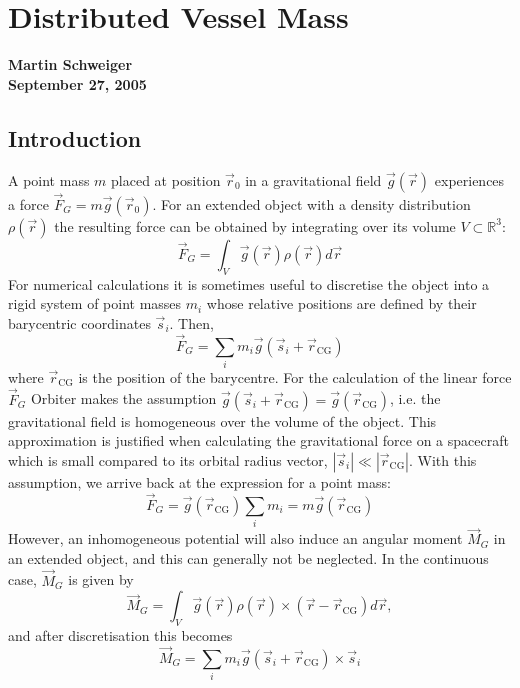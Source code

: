 \documentclass[Orbiter Technical Reference.tex]{subfiles}
\begin{document}
\section{Distributed Vessel Mass}
\label{sec:dist_vessel_mass}
\textbf{Martin Schweiger}\\
\textbf{September 27, 2005}


\subsection{Introduction}
A point mass $m$ placed at position $\vec{r}_0$ in a gravitational field $\vec{g}(\vec{r})$ experiences a force $\vec{F}_G = m\vec{g}(\vec{r}_0)$.
For an extended object with a density distribution $\rho(\vec{r})$ the resulting force can be obtained by integrating over its volume $V \subset \mathbb{R}^3$:
\begin{equation*}
\vec{F}_G = \int_V \vec{g}(\vec{r})\rho(\vec{r}) d\vec{r}
\end{equation*}
For numerical calculations it is sometimes useful to discretise the object into a rigid system of point masses $m_i$ whose relative positions are defined by their barycentric coordinates $\vec{s}_i$. Then,
\begin{equation*}
\vec{F}_G = \sum_i m_i \vec{g}(\vec{s}_i+\vec{r}_\text{CG})
\end{equation*}
where $\vec{r}_\text{CG}$ is the position of the barycentre. For the calculation of the linear force $\vec{F}_G$ Orbiter makes the assumption $\vec{g}(\vec{s}_i + \vec{r}_\text{CG}) = \vec{g}(\vec{r}_\text{CG})$, i.e. the gravitational field is homogeneous over the volume of the object. This approximation is justified when calculating the gravitational force on a spacecraft which is small compared to its orbital radius vector, $|\vec{s}_i| \ll |\vec{r}_\text{CG}|$. With this assumption, we arrive back at the expression for a point mass:
\begin{equation*}
\vec{F}_G = \vec{g}(\vec{r}_\text{CG}) \sum_i m_i = m \vec{g}(\vec{r}_\text{CG})
\end{equation*}
However, an inhomogeneous potential will also induce an angular moment $\vec{M}_G$ in an extended object, and this can generally not be neglected.
In the continuous case, $\vec{M}_G$ is given by
\begin{equation}\label{eq:cont_torque}
\vec{M}_G = \int_V \vec{g}(\vec{r}) \rho(\vec{r}) \times (\vec{r}-\vec{r}_\text{CG}) d\vec{r},
\end{equation}
and after discretisation this becomes
\begin{equation}\label{eq:torque}
\vec{M}_G = \sum_i m_i \vec{g}(\vec{s}_i + \vec{r}_\text{CG}) \times \vec{s}_i
\end{equation}
\end{document}
